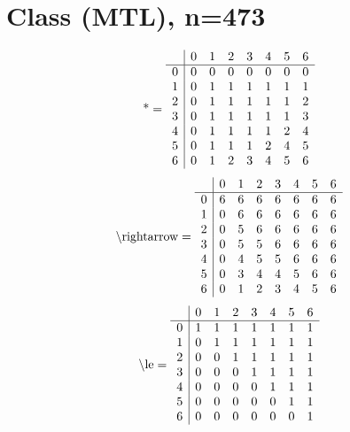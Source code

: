 \documentclass[11pt]{article}
\begin{document}
\section{Class (MTL), n=473}
\[\text{*} = 
\begin{array}{r | r r r r r r r}
 & 0 & 1 & 2 & 3 & 4 & 5 & 6 \\ \hline
0 & 0 & 0 & 0 & 0 & 0 & 0 & 0 \\
1 & 0 & 1 & 1 & 1 & 1 & 1 & 1 \\
2 & 0 & 1 & 1 & 1 & 1 & 1 & 2 \\
3 & 0 & 1 & 1 & 1 & 1 & 1 & 3 \\
4 & 0 & 1 & 1 & 1 & 1 & 2 & 4 \\
5 & 0 & 1 & 1 & 1 & 2 & 4 & 5 \\
6 & 0 & 1 & 2 & 3 & 4 & 5 & 6 \\
\end{array}
\]
\[\text{\textbackslash rightarrow} = 
\begin{array}{r | r r r r r r r}
 & 0 & 1 & 2 & 3 & 4 & 5 & 6 \\ \hline
0 & 6 & 6 & 6 & 6 & 6 & 6 & 6 \\
1 & 0 & 6 & 6 & 6 & 6 & 6 & 6 \\
2 & 0 & 5 & 6 & 6 & 6 & 6 & 6 \\
3 & 0 & 5 & 5 & 6 & 6 & 6 & 6 \\
4 & 0 & 4 & 5 & 5 & 6 & 6 & 6 \\
5 & 0 & 3 & 4 & 4 & 5 & 6 & 6 \\
6 & 0 & 1 & 2 & 3 & 4 & 5 & 6 \\
\end{array}
\]
\[\text{\textbackslash le} = 
\begin{array}{r | r r r r r r r}
 & 0 & 1 & 2 & 3 & 4 & 5 & 6 \\ \hline
0 & 1 & 1 & 1 & 1 & 1 & 1 & 1 \\
1 & 0 & 1 & 1 & 1 & 1 & 1 & 1 \\
2 & 0 & 0 & 1 & 1 & 1 & 1 & 1 \\
3 & 0 & 0 & 0 & 1 & 1 & 1 & 1 \\
4 & 0 & 0 & 0 & 0 & 1 & 1 & 1 \\
5 & 0 & 0 & 0 & 0 & 0 & 1 & 1 \\
6 & 0 & 0 & 0 & 0 & 0 & 0 & 1 \\
\end{array}
\]
\end{document}
